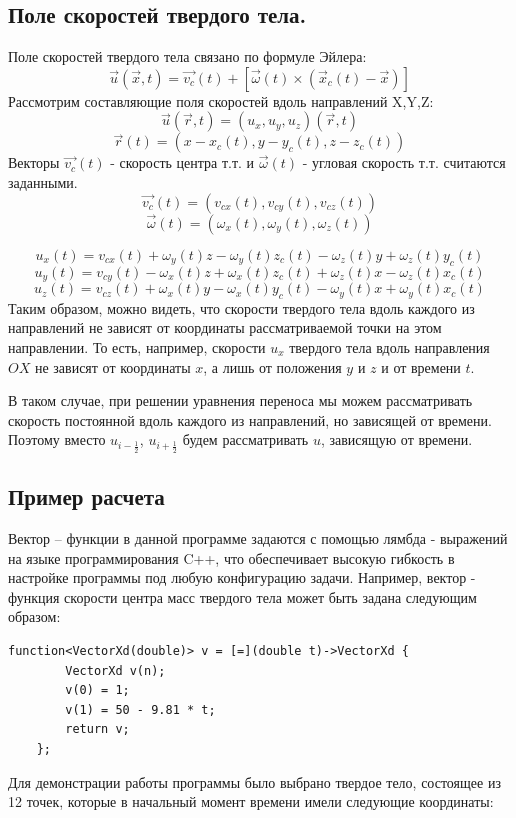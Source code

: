 \documentclass[12pt,a4paper]{article}
\begin{document}
\subsection{Поле скоростей твердого тела.}
\label{sec:RBVF}
Поле скоростей твердого тела связано по формуле Эйлера:
\[
\overrightarrow{u}(\overrightarrow{x},t)=\overrightarrow{v_c}(t)+[\overrightarrow{\omega}(t)\times (\overrightarrow{x}_c(t)-\overrightarrow{x})]
\]
Рассмотрим составляющие поля скоростей вдоль направлений X,Y,Z:
\[ \overrightarrow{u}(\overrightarrow{r},t)=(u_x, u_y, u_z)(\overrightarrow{r},t) \]
\[ \overrightarrow{r}(t)=(x-x_c(t), y-y_c(t), z-z_c(t)) \]
Векторы $\overrightarrow{v_c}(t)$ - скорость центра т.т. и $\overrightarrow{\omega}(t)$ - угловая скорость т.т. считаются заданными.
\[ \overrightarrow{v_c}(t)=(v_{cx}(t), v_{cy}(t), v_{cz}(t)) \]
\[ \overrightarrow{\omega}(t)=(\omega_x(t), \omega_y(t), \omega_z(t)) \]

\[ u_x(t)=v_{cx}(t)+\omega_y(t)z-\omega_y(t)z_c(t)-\omega_z(t)y+\omega_z(t)y_c(t) \]
\[ u_y(t)=v_{cy}(t)-\omega_x(t)z+\omega_x(t)z_c(t)+\omega_z(t)x-\omega_z(t)x_c(t) \]
\[ u_z(t)=v_{cz}(t)+\omega_x(t)y-\omega_x(t)y_c(t)-\omega_y(t)x+\omega_y(t)x_c(t) \]
Таким образом, можно видеть, что скорости твердого тела вдоль каждого из направлений не зависят от координаты рассматриваемой точки на этом направлении. То есть, например, скорости $u_x$ твердого тела вдоль направления $OX$ не зависят от координаты $x$, а лишь от положения $y$ и $z$ и от времени $t$.

В таком случае, при решении уравнения переноса мы можем рассматривать скорость постоянной вдоль каждого из направлений, но зависящей от времени. Поэтому вместо $u_{i-\frac{1}{2}}$, $u_{i+\frac{1}{2}}$ будем рассматривать $u$, зависящую от времени.

\subsection{Пример расчета}
Вектор – функции в данной программе задаются с помощью лямбда - выражений на языке программирования C++, что обеспечивает высокую гибкость в настройке программы под любую конфигурацию задачи. Например, вектор - функция скорости центра масс твердого тела может быть задана следующим образом:
\begin{lstlisting}
function<VectorXd(double)> v = [=](double t)->VectorXd {
        VectorXd v(n);
        v(0) = 1;
        v(1) = 50 - 9.81 * t;
        return v;
    };
\end{lstlisting}
Для демонстрации работы программы было выбрано твердое тело, состоящее из 12 точек, которые в начальный момент времени имели следующие координаты:
\end{document}
